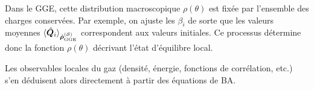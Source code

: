 { 
}

\medskip

Dans le \gls{GGE}, cette distribution macroscopique $\rho(\theta)$ est fixée par l’ensemble des charges conservées. Par exemple, on ajuste les $\beta_i$ de sorte que les valeurs moyennes $\langle \hat{\bm{Q}}_i \rangle_{\hat{\bm{\rho}}^{(\mathcal{S})}_{\mathrm{GGE}}}$ correspondent aux valeurs initiales. Ce processus détermine donc la fonction $\rho(\theta)$ décrivant l’état d’équilibre local. 




Les observables locales du gaz (densité, énergie, fonctions de corrélation, etc.) s’en déduisent alors directement à partir des équations de \gls{BA}. 



